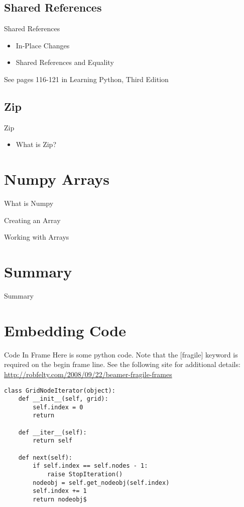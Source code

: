 \documentclass{beamer}
\begin{document}
\subsection{Shared References}
\begin{frame}[fragile]{Shared References}
\begin{itemize}
\item{In-Place Changes}
\item{Shared References and Equality}
\end{itemize}
\tiny{See pages 116-121 in Learning Python, Third Edition}
\end{frame}

\subsection{Zip}
\begin{frame}[fragile]{Zip}
\begin{itemize}
\item{What is Zip?}
\end{itemize}
\end{frame}

\section{Numpy Arrays}
\begin{frame}[fragile]{What is Numpy}
\end{frame}

\begin{frame}[fragile]{Creating an Array}
\end{frame}

\begin{frame}[fragile]{Working with Arrays}
\end{frame}

\section{Summary}
\begin{frame}[fragile]{Summary}
\end{frame}




\section{Embedding Code}
\begin{frame}[fragile]{Code In Frame}
Here is some python code.  Note that the [fragile] keyword is required on the begin frame line.  See the following site for additional details: \url{http://robfelty.com/2008/09/22/beamer-fragile-frames}
\begin{lstlisting}
class GridNodeIterator(object):
    def __init__(self, grid):
        self.index = 0
        return
        
    def __iter__(self):
        return self
        
    def next(self):
        if self.index == self.nodes - 1:
            raise StopIteration()
        nodeobj = self.get_nodeobj(self.index)
        self.index += 1
        return nodeobj$
\end{lstlisting}
\end{frame}
\end{document}
